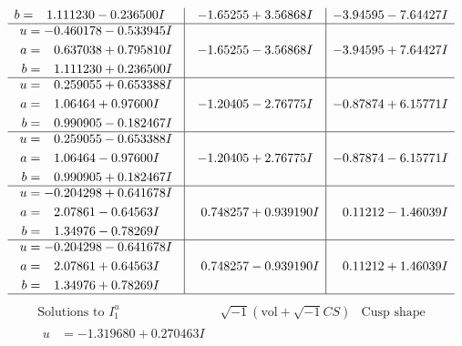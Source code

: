 \documentclass[1p]{elsarticle_modified}
\theoremstyle{definition}
\newcommand{\I}{\sqrt{-1}}
\begin{document}
$$\begin{array}{c|c|c}
\begin{aligned}
b &= \phantom{-}1.111230 - 0.236500 I\end{aligned}
 & -1.65255 + 3.56868 I & -3.94595 - 7.64427 I \\ \hline\begin{aligned}
u &= -0.460178 - 0.533945 I \\
a &= \phantom{-}0.637038 + 0.795810 I \\
b &= \phantom{-}1.111230 + 0.236500 I\end{aligned}
 & -1.65255 - 3.56868 I & -3.94595 + 7.64427 I \\ \hline\begin{aligned}
u &= \phantom{-}0.259055 + 0.653388 I \\
a &= \phantom{-}1.06464 + 0.97600 I \\
b &= \phantom{-}0.990905 - 0.182467 I\end{aligned}
 & -1.20405 - 2.76775 I & -0.87874 + 6.15771 I \\ \hline\begin{aligned}
u &= \phantom{-}0.259055 - 0.653388 I \\
a &= \phantom{-}1.06464 - 0.97600 I \\
b &= \phantom{-}0.990905 + 0.182467 I\end{aligned}
 & -1.20405 + 2.76775 I & -0.87874 - 6.15771 I \\ \hline\begin{aligned}
u &= -0.204298 + 0.641678 I \\
a &= \phantom{-}2.07861 - 0.64563 I \\
b &= \phantom{-}1.34976 - 0.78269 I\end{aligned}
 & \phantom{-}0.748257 + 0.939190 I & \phantom{-}0.11212 - 1.46039 I \\ \hline\begin{aligned}
u &= -0.204298 - 0.641678 I \\
a &= \phantom{-}2.07861 + 0.64563 I \\
b &= \phantom{-}1.34976 + 0.78269 I\end{aligned}
 & \phantom{-}0.748257 - 0.939190 I & \phantom{-}0.11212 + 1.46039 I\\
 \hline 
 \end{array}$$\newpage$$\begin{array}{c|c|c}  
\text{Solutions to }I^u_{1}& \I (\text{vol} + \sqrt{-1}CS) & \text{Cusp shape}\\
 \hline 
\begin{aligned}
u &= -1.319680 + 0.270463 I \\

\end{aligned}
\end{array}$$
\end{document}
